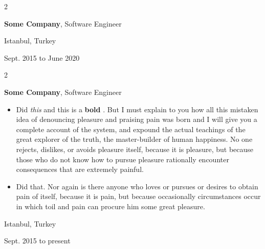 \documentclass[10pt, letterpaper]{article}
\newenvironment{highlights}{
    \begin{itemize}[
        topsep=0.10 cm,
        parsep=0.10 cm,
        partopsep=0pt,
        itemsep=0pt,
        leftmargin=0.4 cm + 10pt
    ]
}{
    \end{itemize}
} %
\newenvironment{twocolentry}[2][]{
    \onecolentry
    \def\secondColumn{#2}
    \setcolumnwidth{\fill, 4.5 cm}
    \begin{paracol}{2}
}{
    \switchcolumn \raggedleft \secondColumn
    \end{paracol}
    \endonecolentry
} %
\let\hrefWithoutArrow\href
\renewcommand{\href}[2]{\hrefWithoutArrow{#1}{\mbox{\ifthenelse{\equal{#2}{}}{ }{#2 }\raisebox{.15ex}{\footnotesize \faExternalLink*}}}}
\begin{document}
        \vspace{0.2 cm}

        \begin{twocolentry}{
            Istanbul, Turkey

        Sept. 2015 to June 2020
        }
            \textbf{Some \textnormal{Company}}, Software Engineer
        \end{twocolentry}


        \vspace{0.2 cm}

        \begin{twocolentry}{
            Istanbul, Turkey

        Sept. 2015 to present
        }
            \textbf{Some \textnormal{Company}}, Software Engineer
            \begin{highlights}
                \item Did \textit{this} and this is a \textbf{bold} \href{https://example.com}{link}. But I must explain to you how all this mistaken idea of denouncing pleasure and praising pain was born and I will give you a complete account of the system, and expound the actual teachings of the great explorer of the truth, the master-builder of human happiness. No one rejects, dislikes, or avoids pleasure itself, because it is pleasure, but because those who do not know how to pursue pleasure rationally encounter consequences that are extremely painful.
                \item Did that. Nor again is there anyone who loves or pursues or desires to obtain pain of itself, because it is pain, but because occasionally circumstances occur in which toil and pain can procure him some great pleasure.
            \end{highlights}
        \end{twocolentry}


        \vspace{0.2 cm}
\end{document}
